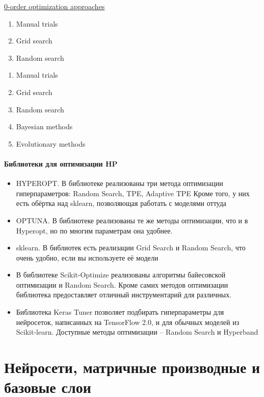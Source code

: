 \documentclass[a4paper, 14pt]{article}
\begin{document}
    \underline{0-order optimization approaches}
    
    \begin{enumerate}
        \item Manual trials
        \item Grid search
        \item Random search
    \end{enumerate}
    
    \begin{enumerate}
        \item Manual trials
        \item Grid search
        \item Random search
        \item Bayesian methods
        \item Evolutionary methods
    \end{enumerate}
    
    \subsection{Библиотеки для оптимизации HP}
    
    \begin{itemize}
        \item HYPEROPT\@.
        В библиотеке реализованы три метода оптимизации гиперпараметров: Random Search, TPE, Adaptive TPE
        Кроме того, у них есть обёртка над sklearn, позволяющая работать с моделями оттуда
        \item OPTUNA\@.
        В библиотеке реализованы те же методы оптимизации, что и в Hyperopt, но по многим параметрам она удобнее.
        \item sklearn.
        В библиотек есть реализации Grid Search и Random Search, что очень удобно, если вы используете её модели
        \item В библиотеке Scikit-Optimize реализованы алгоритмы байесовской оптимизации и Random Search.
        Кроме самих методов оптимизации библиотека предоставляет отличный инструментарий для различных.
        \item Библиотека Keras Tuner позволяет подбирать гиперпараметры для нейросеток, написанных на TensorFlow 2.0,
        и для обычных моделей из Scikit-learn.
        Доступные методы оптимизации -- Random Search и Hyperband
    \end{itemize}
    
    \part{Нейросети, матричные производные и базовые слои}
    
\end{document}
